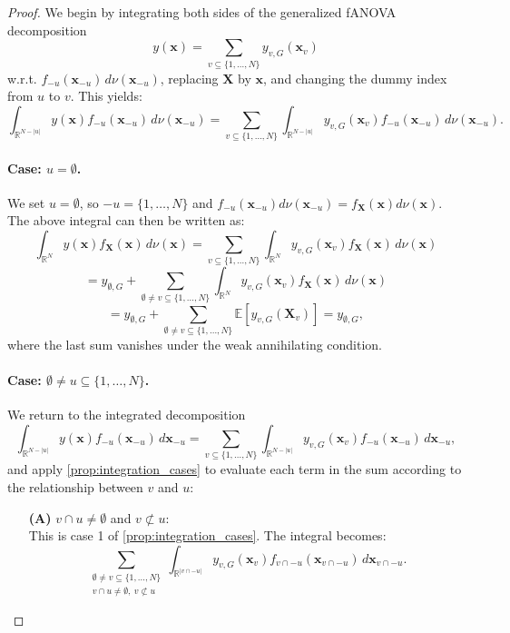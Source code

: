 \begin{proof}
We begin by integrating both sides of the generalized fANOVA decomposition
\[
y(\boldsymbol{x}) = \sum_{v \subseteq \{1,\dots,N\}} y_{v,G}(\boldsymbol{x}_v)
\]
w.r.t. $f_{-u}(\boldsymbol{x}_{-u})\, d \nu(\boldsymbol{x}_{-u})$, replacing $\boldsymbol{X}$ by $\boldsymbol{x}$, and changing the dummy index from $u$ to $v$. This yields:
\[
\int_{\mathbb{R}^{N - |u|}} y(\boldsymbol{x}) f_{-u}(\boldsymbol{x}_{-u}) \, d \nu(\boldsymbol{x}_{-u})
= \sum_{v \subseteq \{1,\dots,N\}} \int_{\mathbb{R}^{N - |u|}} y_{v,G}(\boldsymbol{x}_v) f_{-u}(\boldsymbol{x}_{-u}) \, d \nu(\boldsymbol{x}_{-u}).
\]

\paragraph{Case: \( u = \emptyset \).}
We set $u = \emptyset$, so $-u = \{1,\dots,N\}$ and $f_{-u}(\boldsymbol{x}_{-u}) d \nu(\boldsymbol{x}_{-u}) = f_{\boldsymbol{X}}(\boldsymbol{x}) d \nu(\boldsymbol{x})$. The above integral can then be written as:
\[
\int_{\mathbb{R}^N} y(\boldsymbol{x}) f_{\boldsymbol{X}}(\boldsymbol{x}) \, d \nu(\boldsymbol{x})
= \sum_{v \subseteq \{1,\dots,N\}} \int_{\mathbb{R}^N} y_{v,G}(\boldsymbol{x}_v) f_{\boldsymbol{X}}(\boldsymbol{x}) \, d \nu(\boldsymbol{x})
\]
\[
= y_{\emptyset,G}
+ \sum_{\emptyset \ne v \subseteq \{1,\dots,N\}} \int_{\mathbb{R}^N} y_{v,G}(\boldsymbol{x}_v) f_{\boldsymbol{X}}(\boldsymbol{x}) \, d \nu(\boldsymbol{x})
\]
\[
= y_{\emptyset,G} + \sum_{\emptyset \ne v \subseteq \{1,\dots,N\}} \mathbb{E}[y_{v,G}(\boldsymbol{X}_v)] = y_{\emptyset,G},
\]
where the last sum vanishes under the weak annihilating condition.

\paragraph{Case: \( \emptyset \ne u \subseteq \{1,\dots,N\} \).}
We return to the integrated decomposition
\[
\int_{\mathbb{R}^{N - |u|}} y(\boldsymbol{x}) f_{-u}(\boldsymbol{x}_{-u}) \, d\boldsymbol{x}_{-u}
= \sum_{v \subseteq \{1,\dots,N\}} \int_{\mathbb{R}^{N - |u|}} y_{v,G}(\boldsymbol{x}_v) f_{-u}(\boldsymbol{x}_{-u}) \, d\boldsymbol{x}_{-u},
\]
and apply \autoref{prop:integration_cases} to evaluate each term in the sum according to the relationship between $v$ and $u$:

\begin{itemize}
  \item[\textbf{(A)}] \( v \cap u \ne \emptyset \) and \( v \not\subset u \): \\
  This is case 1 of \autoref{prop:integration_cases}. The integral becomes:
  \[
  \sum_{\substack{\emptyset \ne v \subseteq \{1,\dots,N\} \\ v \cap u \ne \emptyset,\ v \not\subset u}} 
  \int_{\mathbb{R}^{|v \cap -u|}} y_{v,G}(\boldsymbol{x}_v) f_{v \cap -u}(\boldsymbol{x}_{v \cap -u}) \, d\boldsymbol{x}_{v \cap -u}.
  \]


\end{itemize}
\end{proof}
